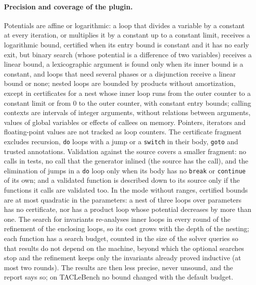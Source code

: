 \documentclass[oneside,english]{amsart}
\numberwithin{equation}{section}
\numberwithin{figure}{section}
\theoremstyle{plain}
\theoremstyle{definition}
\theoremstyle{plain}
\theoremstyle{remark}
\theoremstyle{plain}
\theoremstyle{definition}
\theoremstyle{plain}
\theoremstyle{remark}
\begin{document}
\paragraph{Precision and coverage of the plugin.}
Potentials are affine or logarithmic: a loop that divides a variable by a constant at every iteration, or multiplies it by a constant up to a constant limit, receives a logarithmic bound, certified when its entry bound is constant and it has no early exit, but binary search (whose potential is a difference of two variables) receives a linear bound, a lexicographic argument is found only when its inner bound is a constant, and loops that need several phases or a disjunction receive a linear bound or none; nested loops are bounded by products without amortization, except in certificates for a nest whose inner loop runs from the outer counter to a constant limit or from $0$ to the outer counter, with constant entry bounds; calling contexts are intervals of integer arguments, without relations between arguments, values of global variables or effects of callees on memory. Pointers, iterators and floating-point values are not tracked as loop counters. The certificate fragment excludes recursion, \texttt{do} loops with a jump or a \texttt{switch} in their body, \texttt{goto} and trusted annotations. Validation against the source covers a smaller fragment: no calls in tests, no call that the generator inlined (the source has the call), and the elimination of jumps in a \texttt{do} loop only when its body has no \texttt{break} or \texttt{continue} of its own; and a validated function is described down to its source only if the functions it calls are validated too. In the mode without ranges, certified bounds are at most quadratic in the parameters: a nest of three loops over parameters has no certificate, nor has a product loop whose potential decreases by more than one. The search for invariants re-analyses inner loops in every round of the refinement of the enclosing loops, so its cost grows with the depth of the nesting; each function has a search budget, counted in the size of the solver queries so that results do not depend on the machine, beyond which the optional searches stop and the refinement keeps only the invariants already proved inductive (at most two rounds). The results are then less precise, never unsound, and the report says so; on TACLeBench no bound changed with the default budget.
\end{document}
